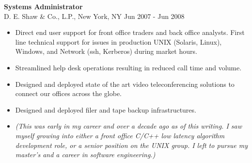 \textbf{Systems Administrator} \\
D. E. Shaw \& Co., L.P., New York, NY \hfill Jun 2007 - Jun 2008
\begin{itemize}  \itemsep -2pt %
\item Direct end user support for front office traders and back office
      analysts. First line technical support for issues in production
      UNIX (Solaris, Linux), Windows, and Network (ssh, Kerberos) during
      market hours.
\item Streamlined help desk operations resulting in reduced call time and
      volume.
\item Designed and deployed state of the art video teleconferencing
      solutions to connect our offices across the globe.
\item Designed and deployed filer and tape backup infrastructures.
\item \textit{(This was early in my career and over a decade ago as of this
      writing. I saw myself growing into either a front office C/C++
      low latency algorithm development role, or a senior position
      on the UNIX group. I left to pursue my master's and a career
      in software engineering.)}
\end{itemize}
